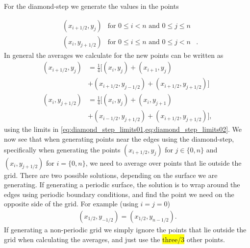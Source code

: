 For the diamond-step we generate the values in the points

\begin{align}
    &(x_{i+1/2}, y_j) &\text{for } 0\leq i<n \text{ and } 0\leq j \leq n& \label{eq:diamond_step_limits01}\\
    &(x_i, y_{j+1/2}) &\text{for } 0\leq i\leq n \text{ and } 0\leq j < n&. \label{eq:diamond_step_limits02}
\end{align}
In general the averages we calculate for the new points can be written as
\begin{align}
    (x_{i+1/2}, y_j) 
    &= 
    \frac{1}{4}\big[
        (x_i, y_j) + (x_{i+1}, y_j) \nonumber\\
        &+ (x_{i+1/2}, y_{j-1/2}) + (x_{i+1/2}, y_{j+1/2})
    \big]
    \label{eq:diamond_step01}\\
    (x_i, y_{j+1/2}) 
    &= 
    \frac{1}{4}\big[
        (x_i, y_j) + (x_i, y_{j+1}) \nonumber\\
        &+ (x_{i-1/2}, y_{j+1/2}) + (x_{i+1/2}, y_{j+1/2})
    \big],
    \label{eq:diamond_step02}
\end{align}
using the limits in \cref{eq:diamond_step_limits01,eq:diamond_step_limits02}. We now see that when generating points near the edges using the diamond-step, specifically when generating the points $(x_{i+1/2}, y_j)$ for $j \in \{0, n\}$ and $(x_i, y_{j+1/2})$ for $i = \{0, n\}$, we need to average over points that lie outside the grid. There are two possible solutions, depending on the surface we are generating. If generating a periodic surface, the solution is to wrap around the edges using periodic boundary conditions, and find the point we need on the opposite side of the grid. For example (using $i = j = 0$)
\begin{align*}
    (x_{1/2}, y_{-1/2}) = (x_{1/2}, y_{n-1/2}).
\end{align*}
If generating a non-periodic grid we simply ignore the points that lie outside the grid when calculating the averages, and just use the \hl{three/3} other points.

